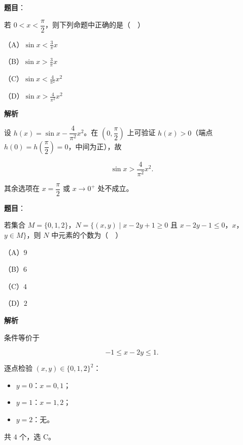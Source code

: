 \begin{answer}

\textbf{题目}：

若 $0<x<\dfrac{\pi}{2}$，则下列命题中正确的是（　）

（A）$\sin x<\frac3\pi x$

（B）$\sin x>\frac3\pi x$

（C）$\sin x<\frac4{\pi^2}x^2$

（D）$\sin x>\frac4{\pi^2}x^2$

\textbf{解析}

设 $h(x)=\sin x-\dfrac4{\pi^2}x^2$。在 $\left(0,\dfrac{\pi}{2}\right)$ 上可验证 $h(x)>0$（端点 $h(0)=h\left(\dfrac{\pi}{2}\right)=0$，中间为正），故

\nopagebreak[4]
\[\sin x>\frac4{\pi^2}x^2.\]

其余选项在 $x=\dfrac{\pi}{2}$ 或 $x\to0^+$ 处不成立。


\end{answer}
\begin{answer}

\textbf{题目}：

若集合 $M=\{0,1,2\}$，$N=\{(x,y)\mid x-2y+1\geqslant0$ 且 $x-2y-1\leqslant0$，$x$，$y\in M\}$，则 $N$ 中元素的个数为（　）

（A）$9$

（B）$6$

（C）$4$

（D）$2$

\textbf{解析}

条件等价于

\nopagebreak[4]
\[-1\leqslant x-2y\leqslant1.\]

逐点检验 $(x,y)\in\{0,1,2\}^2$：

\begin{itemize}
\item $y=0$：$x=0,1$；
\item $y=1$：$x=1,2$；
\item $y=2$：无。
\end{itemize}

共 $4$ 个，选 C。


\end{answer}
